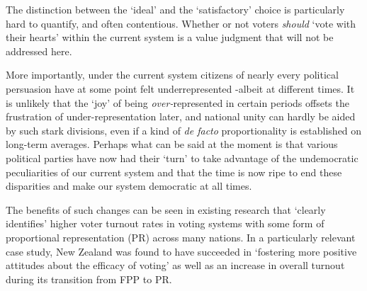 \documentclass[DIV=calc, paper=a4, fontsize=11pt, twocolumn]{scrartcl}	 %
\begin{document}
The distinction between the `ideal' and the `satisfactory' choice is particularly hard to quantify, and often contentious.
Whether or not voters \emph{should} `vote with their hearts' within the current system is a value judgment that will not be addressed here. 


More importantly, under the current system citizens of nearly every political persuasion have at some point felt underrepresented \--albeit at different times. It is unlikely that the `joy' of being \emph{over-}represented in certain periods offsets the frustration of under-representation later, and
 national unity can hardly be aided by such stark divisions, even if a kind of \emph{ de facto} proportionality is established on long-term averages. 
Perhaps what can be said at the moment is that various political parties have now had their `turn' to take advantage of the undemocratic peculiarities of our current system and that the time is now ripe to end these disparities and make our system democratic at all times. 

The benefits of such changes can be seen in existing research that `clearly identifies' higher voter turnout rates in voting systems with some form of proportional representation (PR) \cite{Blais}
 across many nations. In a particularly relevant case study, New Zealand was found to have succeeded in `fostering more positive attitudes about the efficacy of voting' as well as an increase in overall turnout during its transition from FPP to PR\cite{NZ_PR_results}.
\end{document}
